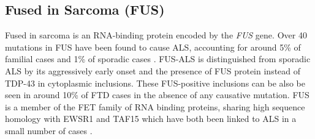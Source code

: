




%
%
%
%
%






\subsection{Fused in Sarcoma (FUS)}
Fused in sarcoma is an RNA-binding protein encoded by the \textit{FUS} gene. Over 40 mutations in FUS have been found to cause ALS, accounting for around 5\% of familial cases and 1\% of sporadic cases \citep{Vance2009-ye,Tan07102016}. FUS-ALS is distinguished from sporadic ALS by its aggressively early onset and the presence of FUS protein instead of TDP-43 in cytoplasmic inclusions. These FUS-positive inclusions can be also be seen in around 10\% of FTD cases \citep{Neumann2009} in the absence of any causative mutation. FUS is a member of the FET family of RNA binding proteins, sharing high sequence homology with EWSR1 and TAF15 \citep{Kovar2011} which have both been linked to ALS in a small number of cases \citep{Neumann2011, Couthouis2011,Ticozzi2011-bs,Couthouis2012}.

